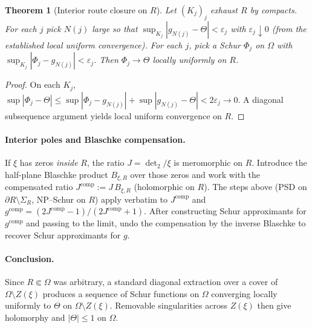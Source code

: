 \documentclass[11pt]{article}
\newtheorem{theorem}{Theorem}
\theoremstyle{remark}
\begin{document}
\begin{theorem}[Interior route closure on $R$]
Let $(K_j)_j$ exhaust $R$ by compacts. For each $j$ pick $N(j)$ large so that $\sup_{K_j}|g_{N(j)}-\Theta|<\varepsilon_j$ with $\varepsilon_j\downarrow0$ (from the established local uniform convergence). For each $j$, pick a Schur $\Phi_j$ on $\Omega$ with $\sup_{K_j}|\Phi_j-g_{N(j)}|<\varepsilon_j$. Then $\Phi_j\to\Theta$ locally uniformly on $R$.
\end{theorem}

\begin{proof}
On each $K_j$, $\sup|\Phi_j-\Theta|\le \sup|\Phi_j-g_{N(j)}|+\sup|g_{N(j)}-\Theta|<2\varepsilon_j\to0$. A diagonal subsequence argument yields local uniform convergence on $R$.
\end{proof}

\paragraph{Interior poles and Blaschke compensation.} If $\xi$ has zeros \emph{inside} $R$, the ratio $J=\det_2/\xi$ is meromorphic on $R$. Introduce the half-plane Blaschke product $B_{\xi,R}$ over those zeros and work with the compensated ratio $J^{\mathrm{comp}}:=J\,B_{\xi,R}$ (holomorphic on $R$). The steps above (PSD on $\partial R\setminus\Sigma_R$, NP--Schur on $R$) apply verbatim to $J^{\mathrm{comp}}$ and $g^{\mathrm{comp}}=(2J^{\mathrm{comp}}-1)/(2J^{\mathrm{comp}}+1)$. After constructing Schur approximants for $g^{\mathrm{comp}}$ and passing to the limit, undo the compensation by the inverse Blaschke to recover Schur approximants for $g$.

\paragraph{Conclusion.} Since $R\Subset\Omega$ was arbitrary, a standard diagonal extraction over a cover of $\Omega\setminus Z(\xi)$ produces a sequence of Schur functions on $\Omega$ converging locally uniformly to $\Theta$ on $\Omega\setminus Z(\xi)$. Removable singularities across $Z(\xi)$ then give holomorphy and $|\Theta|\le 1$ on $\Omega$.
\end{document}
